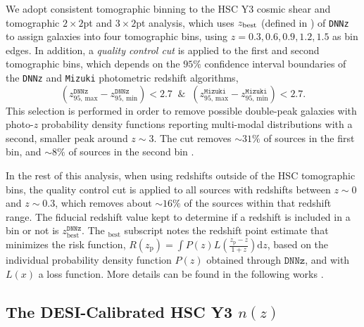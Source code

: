 We adopt consistent tomographic binning to the HSC Y3 cosmic shear \cite{Li2023_HSCY3_CosmicShear, Dalal2023CosmoShearHSC} and tomographic $2\times2$pt\cite{Zhang2025aTomographic2x2pt} and $3\times2$pt analysis\cite{Zhang2025bTomographic3x2pt}, which uses $z_{\rm best}$ (defined in \cite{HSCPHotozTanaka2017}) of \texttt{DNNz} to assign galaxies into four tomographic bins, using $z=0.3, 0.6, 0.9, 1.2,1.5$ as bin edges. 
In addition, a \textit{quality control cut} is applied to the first and second tomographic bins, which depends on the $95\%$ confidence interval boundaries of the \texttt{DNNz} \cite{DNNZHSCNishizawa2020} and \texttt{Mizuki} \cite{MizukiHSCTanaka2015} photometric redshift algorithms,
\begin{equation}\label{eq:calib_cut}
(z^{\texttt{DNNz}}_{95,\,\mathrm{max}}-z^{\texttt{DNNz}}_{95,\,\mathrm{min}})<2.7\;\;\&\;\;(z^{\texttt{Mizuki}}_{95,\,\mathrm{max}}-z^{\texttt{Mizuki}}_{95,\,\mathrm{min}})<2.7.
\end{equation}
This selection is performed in order to remove possible double-peak galaxies with photo-$z$ probability density functions reporting multi-modal distributions with a second, smaller peak around $z\sim3$. The cut removes $\sim31\%$ of sources in the first bin, and $\sim8\%$ of sources in the second bin \cite{HSCClusteringRau2023}.


In the rest of this analysis, when using redshifts outside of the HSC tomographic bins, the quality control cut is applied to all sources with redshifts between $z\sim0$ and $z\sim0.3$, which removes about $\sim16\%$ of the sources within that redshift range. The fiducial redshift value kept to determine if a redshift is included in a bin or not is $z_{\mathrm{best}}^{\texttt{DNNz}}$. The $_\mathrm{best}$ subscript notes the redshift point estimate that minimizes the risk function, $R(z_{\mathrm{p}})=\int P(z)L(\frac{z_{\mathrm{p}}-z}{1+z})\mathrm{d}z$, based on the individual probability density function $P(z)$ obtained through $\texttt{DNNz}$, and with $L(x)$ a loss function. More details can be found in the following works \cite{HSCPHotozTanaka2017, DNNZHSCNishizawa2020}.

\subsection{The DESI-Calibrated HSC Y3 $n(z)$}
\label{sec:data:desi}

